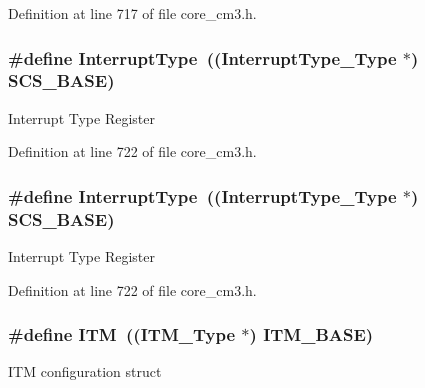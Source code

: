 Definition at line 717 of file core\+\_\+cm3.\+h.

\subsubsection[{\texorpdfstring{Interrupt\+Type}{InterruptType}}]{\setlength{\rightskip}{0pt plus 5cm}\#define Interrupt\+Type~(({\bf Interrupt\+Type\+\_\+\+Type} $\ast$) {\bf S\+C\+S\+\_\+\+B\+A\+SE})}\hypertarget{group___c_m_s_i_s___c_m3__core__register_ga164238adbad56f07c7dd4e912af748dd}{}\label{group___c_m_s_i_s___c_m3__core__register_ga164238adbad56f07c7dd4e912af748dd}
Interrupt Type Register 

Definition at line 722 of file core\+\_\+cm3.\+h.

\subsubsection[{\texorpdfstring{Interrupt\+Type}{InterruptType}}]{\setlength{\rightskip}{0pt plus 5cm}\#define Interrupt\+Type~(({\bf Interrupt\+Type\+\_\+\+Type} $\ast$) {\bf S\+C\+S\+\_\+\+B\+A\+SE})}\hypertarget{group___c_m_s_i_s___c_m3__core__register_ga164238adbad56f07c7dd4e912af748dd}{}\label{group___c_m_s_i_s___c_m3__core__register_ga164238adbad56f07c7dd4e912af748dd}
Interrupt Type Register 

Definition at line 722 of file core\+\_\+cm3.\+h.

\subsubsection[{\texorpdfstring{I\+TM}{ITM}}]{\setlength{\rightskip}{0pt plus 5cm}\#define I\+TM~(({\bf I\+T\+M\+\_\+\+Type} $\ast$)           {\bf I\+T\+M\+\_\+\+B\+A\+SE})}\hypertarget{group___c_m_s_i_s___c_m3__core__register_gabae7cdf882def602cb787bb039ff6a43}{}\label{group___c_m_s_i_s___c_m3__core__register_gabae7cdf882def602cb787bb039ff6a43}
I\+TM configuration struct 

